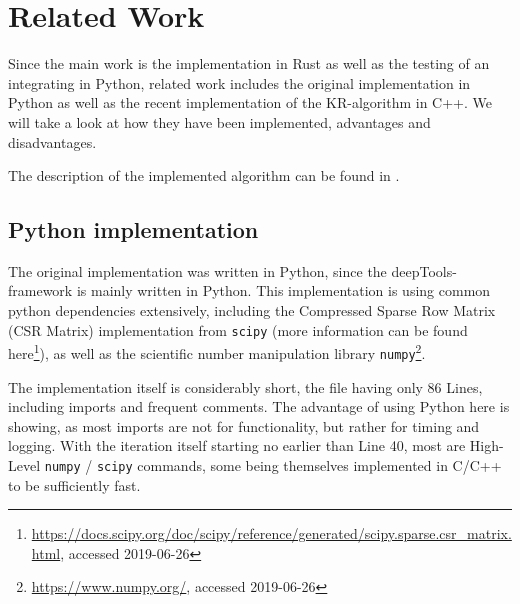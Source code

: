 \chapter{Related Work}\label{chap:relatedwork}






Since the main work is the implementation in Rust as well as the testing of an
integrating in Python, related work includes the original implementation in
Python as well as the recent implementation of the KR-algorithm in C++.
We will take a look at how they have been implemented, advantages and
disadvantages.

 The description of the implemented algorithm can be found in .


\section{Python implementation}\label{sec:python}




The original implementation was written in Python, since the
deepTools-framework is mainly written in Python. This implementation is using
common python dependencies extensively, including the Compressed Sparse Row
Matrix (CSR Matrix) implementation from \verb|scipy| (more information can be found
here\footnote{\url{https://docs.scipy.org/doc/scipy/reference/generated/scipy.sparse.csr_matrix.html},
accessed 2019-06-26}), as well as the scientific number manipulation library
\verb|numpy|\footnote{\url{https://www.numpy.org/}, accessed 2019-06-26}.

The implementation itself is considerably short, the file having only 86 Lines,
including imports and frequent comments. The advantage of using Python here is
showing, as most imports are not for functionality, but rather for timing and
logging. With the iteration itself starting no earlier than Line 40, most
are High-Level \verb|numpy| / \verb|scipy| commands, some being themselves
implemented in C/C++ to be sufficiently fast.

